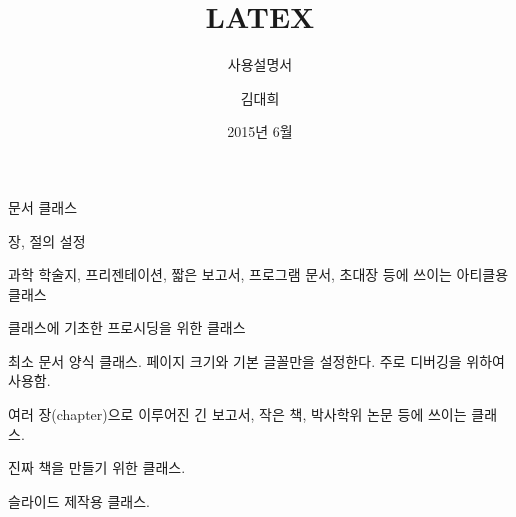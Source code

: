 \documentclass[ aspectratio=149,  10pt,blue,xcolor=pdftex,dvipsnames,table,handout,notes]{beamer}
\begin{document}
	

			\title{LATEX}
			\subtitle{사용설명서}
			\author{김대희}
			\date[2015.06.30]{2015년 6월}



		\begin{frame}[plain]
		\titlepage
		\end{frame}

		\begin{frame}[plain]
		\end{frame}




		\begin{frame}[t,shrink=00]{문서 클래스}


			\begin{block} {장, 절의 설정}
			\begin{description}[1234567890]
			\item [article] 과학 학술지, 프리젠테이션, 짧은 보고서, 프로그램 문서, 초대장 등에 쓰이는 아티클용 클래스
			\item [proc article] 클래스에 기초한 프로시딩을 위한 클래스 
			\item [minimal] 최소 문서 양식 클래스. 페이지 크기와 기본 글꼴만을 설정한다. 주로 디버깅을 위하여 사용함.
			\item [report] 여러 장(chapter)으로 이루어진 긴 보고서, 작은 책, 박사학위 논문 등에 쓰이는 클래스.
			\item [book] 진짜 책을 만들기 위한 클래스.
			\item [slides] 슬라이드 제작용 클래스. 
			\end{description}
			\end{block}



		\note[item]{}
		\end{frame}
\end{document}
